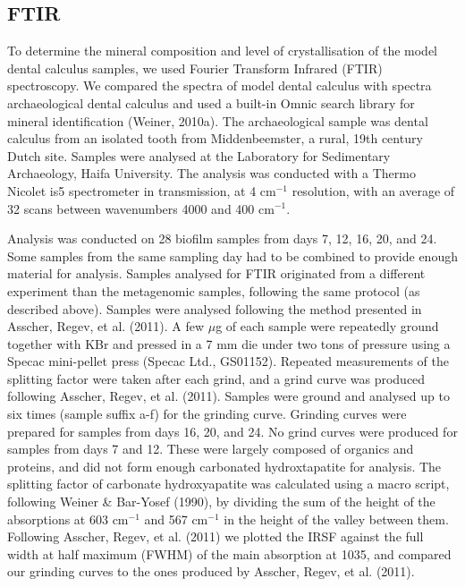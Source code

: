 \documentclass[
]{article}
\begin{document}
\hypertarget{ftir}{%
\subsection{FTIR}\label{ftir}}

To determine the mineral composition and level of crystallisation of the
model dental calculus samples, we used Fourier Transform Infrared (FTIR)
spectroscopy. We compared the spectra of model dental calculus with
spectra archaeological dental calculus and used a built-in Omnic search
library for mineral identification (Weiner, 2010a). The archaeological
sample was dental calculus from an isolated tooth from Middenbeemster, a
rural, 19th century Dutch site. Samples were analysed at the Laboratory
for Sedimentary Archaeology, Haifa University. The analysis was
conducted with a Thermo Nicolet is5 spectrometer in transmission, at 4
cm\(^{-1}\) resolution, with an average of 32 scans between wavenumbers
4000 and 400 cm\(^{-1}\).

Analysis was conducted on 28 biofilm samples from days 7, 12, 16, 20,
and 24. Some samples from the same sampling day had to be combined to
provide enough material for analysis. Samples analysed for FTIR
originated from a different experiment than the metagenomic samples,
following the same protocol (as described above). Samples were analysed
following the method presented in Asscher, Regev, et al. (2011). A few
\(\mu\)g of each sample were repeatedly ground together with KBr and
pressed in a 7 mm die under two tons of pressure using a Specac
mini-pellet press (Specac Ltd., GS01152). Repeated measurements of the
splitting factor were taken after each grind, and a grind curve was
produced following Asscher, Regev, et al. (2011). Samples were ground
and analysed up to six times (sample suffix a-f) for the grinding curve.
Grinding curves were prepared for samples from days 16, 20, and 24. No
grind curves were produced for samples from days 7 and 12. These were
largely composed of organics and proteins, and did not form enough
carbonated hydroxtapatite for analysis. The splitting factor of
carbonate hydroxyapatite was calculated using a macro script, following
Weiner \& Bar-Yosef (1990), by dividing the sum of the height of the
absorptions at 603 cm\(^{-1}\) and 567 cm\(^{-1}\) in the height of the
valley between them. Following Asscher, Regev, et al. (2011) we plotted
the IRSF against the full width at half maximum (FWHM) of the main
absorption at 1035, and compared our grinding curves to the ones
produced by Asscher, Regev, et al. (2011).
\end{document}
